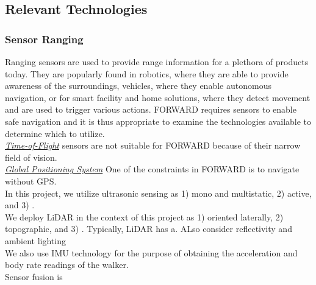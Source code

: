 \subsection{Relevant Technologies}

\subsubsection{Sensor Ranging}
\noindent Ranging sensors are used to provide range information for a plethora of products today. They are popularly found in robotics, where they are able to provide awareness of the surroundings, vehicles, where they enable autonomous navigation, or for smart facility and home solutions, where they detect movement and are used to trigger various actions. FORWARD requires sensors to enable safe navigation and it is thus appropriate to examine the technologies available to determine which to utilize.\\

\noindent \underline{\textit{Time-of-Flight}} sensors are not suitable for FORWARD because of their narrow field of vision.\\

\noindent \underline{\textit{Global Positioning System}} One of the constraints in FORWARD is to navigate without GPS.\\

\noindent In this project, we utilize ultrasonic sensing as 1) mono and multistatic, 2) active, and 3) .\\

\noindent We deploy LiDAR in the context of this project as 1) oriented laterally, 2) topographic, and 3) . Typically, LiDAR has a. ALso consider reflectivity and ambient lighting\\

\noindent We also use IMU technology for the purpose of obtaining the acceleration and body rate readings of the walker.\\

\noindent Sensor fusion is  \\


